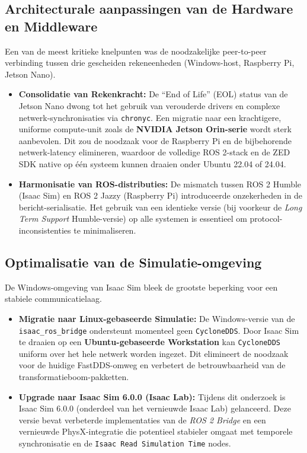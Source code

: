 \subsection{Architecturale aanpassingen van de Hardware en Middleware}
Een van de meest kritieke knelpunten was de noodzakelijke peer-to-peer verbinding tussen drie gescheiden rekeneenheden (Windows-host, Raspberry Pi, Jetson Nano). 
\begin{itemize}
    \item \textbf{Consolidatie van Rekenkracht:} De ``End of Life'' (EOL) status van de Jetson Nano dwong tot het gebruik van verouderde drivers en complexe netwerk-synchronisaties via \texttt{chronyc}. Een migratie naar een krachtigere, uniforme compute-unit zoals de \textbf{NVIDIA Jetson Orin-serie} wordt sterk aanbevolen. Dit zou de noodzaak voor de Raspberry Pi en de bijbehorende netwerk-latency elimineren, waardoor de volledige ROS 2-stack en de ZED SDK native op één systeem kunnen draaien onder Ubuntu 22.04 of 24.04.
    \item \textbf{Harmonisatie van ROS-distributies:} De mismatch tussen ROS 2 Humble (Isaac Sim) en ROS 2 Jazzy (Raspberry Pi) introduceerde onzekerheden in de bericht-serialisatie. Het gebruik van een identieke versie (bij voorkeur de \textit{Long Term Support} Humble-versie) op alle systemen is essentieel om protocol-inconsistenties te minimaliseren.
\end{itemize}

\subsection{Optimalisatie van de Simulatie-omgeving}
De Windows-omgeving van Isaac Sim bleek de grootste beperking voor een stabiele communicatielaag.
\begin{itemize}
    \item \textbf{Migratie naar Linux-gebaseerde Simulatie:} De Windows-versie van de \texttt{isaac\_ros\_bridge} ondersteunt momenteel geen \texttt{CycloneDDS}. Door Isaac Sim te draaien op een \textbf{Ubuntu-gebaseerde Workstation} kan \texttt{CycloneDDS} uniform over het hele netwerk worden ingezet. Dit elimineert de noodzaak voor de huidige FastDDS-omweg en verbetert de betrouwbaarheid van de transformatieboom-pakketten.
    \item \textbf{Upgrade naar Isaac Sim 6.0.0 (Isaac Lab):} Tijdens dit onderzoek is Isaac Sim 6.0.0 (onderdeel van het vernieuwde Isaac Lab) gelanceerd. Deze versie bevat verbeterde implementaties van de \textit{ROS 2 Bridge} en een vernieuwde PhysX-integratie die potentieel stabieler omgaat met temporele synchronisatie en de \texttt{Isaac Read Simulation Time} nodes.
\end{itemize}


